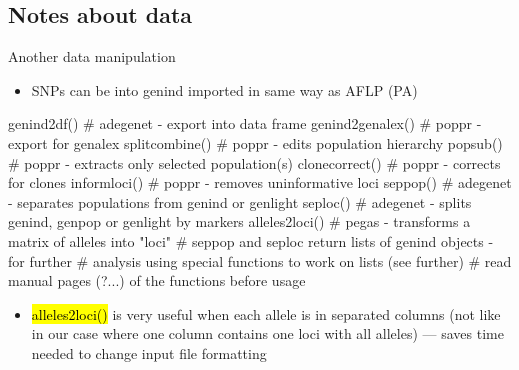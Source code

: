 \documentclass[compress, ucs, xelatex, 11pt, xcolor=svgnames,
  hyperref={
    bookmarks=true,
    unicode=true,
    colorlinks=true,
    pdftitle={Molecular data in R},
    plainpages=false,
    pdfauthor={Vojtech Zeisek},
    pdfsubject={Course about phylogeny and evolution in R},
    pdfcreator={XeLaTeX},
    pdfkeywords={R, evolution, phylogeny, molecular data},
    linkcolor=Tomato,
    anchorcolor=SaddleBrown,
    citecolor=Goldenrod,
    filecolor=DarkMagenta,
    menucolor=Sienna,
    urlcolor=DarkTurquoise,
    pdftex},
  url={hyphens, lowtilde} %
  ]{beamer}
\renewcommand{\texttt}[1]{\hl{\ttfamily #1}}
\begin{document}
\subsection{Notes about data}

\begin{frame}[fragile]{Another data manipulation}
  \begin{itemize}
    \item SNPs can be into genind imported in same way as AFLP (PA)
  \end{itemize}
  \begin{spluscode}
    genind2df() # adegenet - export into data frame
    genind2genalex() # poppr - export for genalex
    splitcombine() # poppr - edits population hierarchy
    popsub() # poppr - extracts only selected population(s)
    clonecorrect() # poppr - corrects for clones
    informloci() # poppr - removes uninformative loci
    seppop() # adegenet - separates populations from genind or genlight
    seploc() # adegenet - splits genind, genpop or genlight by markers
    alleles2loci() # pegas - transforms a matrix of alleles into "loci"
    # seppop and seploc return lists of genind objects - for further
    # analysis using special functions to work on lists (see further)
    # read manual pages (?...) of the functions before usage
  \end{spluscode}
  \begin{itemize}
    \item \texttt{alleles2loci()} is very useful when each allele is in separated columns (not like in our case where one column contains one loci with all alleles) --- saves time needed to change input file formatting
  \end{itemize}
\end{frame}
\end{document}
